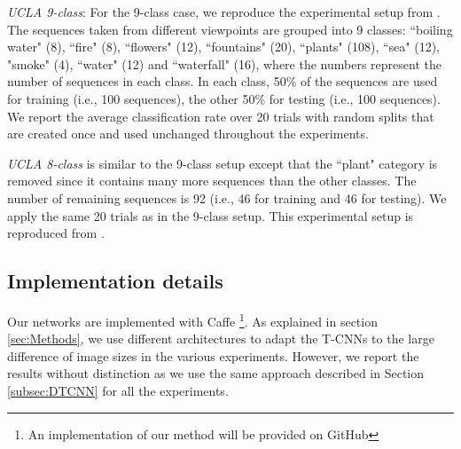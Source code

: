 \documentclass[a4paper,11pt]{article}
\begin{document}
\textit{UCLA 9-class}: For the 9-class case, we reproduce the experimental setup from \cite{ghanem2010maximum,xu2011dynamic,tiwari2016improved}.
The sequences taken from different viewpoints are grouped into 9 classes: ``boiling water" (8), ``fire" (8), ``flowers" (12), ``fountains" (20), ``plants" (108), ``sea" (12), "smoke" (4), ``water" (12) and ``waterfall" (16), where the numbers represent the number of sequences in each class.
In each class, 50\% of the sequences are used for training (i.e., 100 sequences), the other 50\% for testing (i.e., 100 sequences).
We report the average classification rate over 20 trials with random splits that are created once and used unchanged throughout the experiments.

\textit{UCLA 8-class} is similar to the 9-class setup except that the ``plant" category is removed since it contains many more sequences than the other classes.
The number of remaining sequences is 92 (i.e., 46 for training and 46 for testing).
We apply the same 20 trials as in the 9-class setup.
This experimental setup is reproduced from \cite{xu2011dynamic,tiwari2016improved}.

\subsection{Implementation details}%
\label{subsec:ImpDet}
Our networks are implemented with Caffe \cite{jia2014caffe}\footnote{An implementation of our method will be provided on GitHub}.
As explained in section \ref{sec:Methods}, we use different architectures to adapt the T-CNNs to the large difference of image sizes in the various experiments.
However, we report the results without distinction as we use the same approach described in Section \ref{subsec:DTCNN} for all the experiments.
\end{document}
